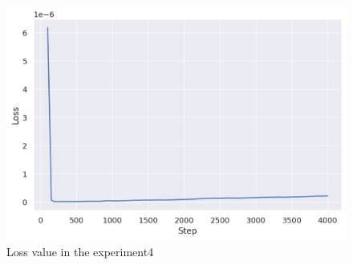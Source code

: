 \begin{figure}[h]
  \centering
  \includegraphics[keepaspectratio, scale=0.4]{images/00_02_rename_9.png}
  \caption{Loss value in the experiment4}
  \label{Fig:loss4}
\end{figure}

